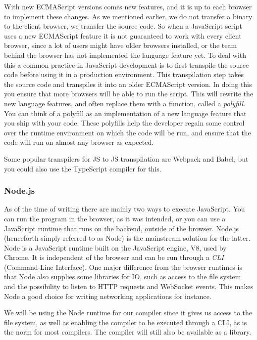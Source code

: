 With new ECMAScript versions comes new features, and it is up to each browser to implement these changes.
As we mentioned earlier, we do not transfer a binary to the client browser, we transfer the source code.
So when a JavaScript script uses a new ECMAScript feature it is not guaranteed to work with every client browser, since a lot of users might have older browsers installed, or the team behind the browser has not implemented the language feature yet.
To deal with this a common practice in JavaScript development is to first transpile the source code before using it in a production environment.
This transpilation step takes the source code and transpiles it into an older ECMAScript version.
In doing this you ensure that more browsers will be able to run the script.
This will rewrite the new language features, and often replace them with a function, called a \textit{polyfill}.
You can think of a polyfill as an implementation of a new language feature that you ship with your code.
These polyfills help the developer regain some control over the runtime environment on which the code will be run, and ensure that the code will run on almost any browser as expected.

Some popular transpilers for JS to JS transpilation are Webpack and Babel, but you could also use the TypeScript compiler for this.

\subsubsection{Node.js}\label{subsubsec:node}

As of the time of writing there are mainly two ways to execute JavaScript.
You can run the program in the browser, as it was intended, or you can use a JavaScript runtime that runs on the backend, outside of the browser.
Node.js (henceforth simply referred to as Node) is the mainstream solution for the latter.
Node is a JavaScript runtime built on the JavaScript engine, V8, used by Chrome.
It is independent of the browser and can be run through a \textit{CLI} (Command-Line Interface).
One major difference from the browser runtimes is that Node also supplies some libraries for IO, such as access to the file system and the possibility to listen to HTTP requests and WebSocket events.
This makes Node a good choice for writing networking applications for instance.

We will be using the Node runtime for our compiler since it gives us access to the file system, as well as enabling the compiler to be executed through a CLI, as is the norm for most compilers.
The compiler will still also be available as a library.

